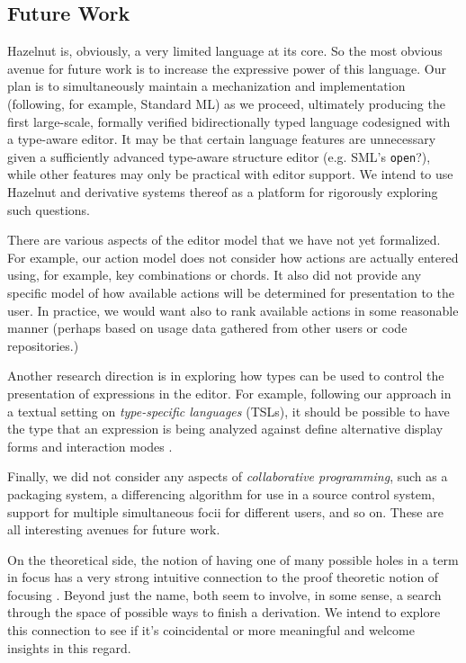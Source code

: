 \documentclass[preprint,9pt]{sigplanconf}
\begin{document}
\subsection{Future Work}
Hazelnut is, obviously, a very limited language at its core. So the most obvious avenue for future work is to increase the expressive power of this language. Our plan is to simultaneously maintain a mechanization and implementation (following, for example, Standard ML) as we proceed, ultimately producing the first large-scale, formally verified bidirectionally typed language codesigned with a type-aware editor. It may be that certain language features are unnecessary given a sufficiently advanced type-aware structure editor (e.g. SML's \texttt{open}?), while other features may only be practical with editor support. We intend to use Hazelnut and derivative systems thereof as a platform for rigorously exploring such questions.

There are various aspects of the editor model that we have not yet formalized. For example, our action model does not consider how actions are actually entered using, for example, key combinations or chords. It also did not provide any specific model of how available actions will be determined for presentation to the user. In practice, we would want also to rank available actions in some reasonable manner (perhaps based on usage data gathered from other users or code repositories.)

Another research direction is in exploring how types can be used to control the presentation of expressions in the editor. For example, following our approach in a textual setting on \emph{type-specific languages} (TSLs), it should be possible to have the type that an expression is being analyzed against define alternative display forms and interaction modes \cite{TSLs}.

Finally, we did not consider any aspects of \emph{collaborative programming}, such as a packaging system, a differencing algorithm for use in a source control system, support for multiple simultaneous focii for different users, and so on. These are all interesting avenues for future work.


On the theoretical side, the notion of having one of many possible holes in a term in focus has a very strong intuitive connection
  to the proof theoretic notion of focusing \cite{Simmons11tr}. Beyond just
  the name, both seem to involve, in some sense, a search through the space of possible
  ways to finish a derivation. We intend to explore this connection to see
  if it's coincidental or more meaningful and welcome insights in this regard.
\end{document}
